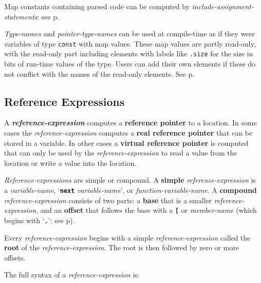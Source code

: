 \documentclass[12pt]{article}
\newcommand{\TT}[1]{{\tt \bfseries #1}}
\newcommand{\key}[1]{{\rm \bfseries #1}}
\newcommand{\emkey}[1]{{\em \bfseries #1}}
\newcommand{\pagref}[1]{p\pageref{#1}}
\begin{document}
Map constants containing parsed code can be computed
by {\em include-assignment-statements}:
see \pagref{INCLUDE-ASSIGNMENT-STATEMENT}.

{\em Type-names} and {\em pointer-type-names} can be used at
compile-time as if they were variables of type {\tt const}
with map values.  These map values are partly read-only,
with the read-only part including elements with labels like
{\tt .size} for the size in bits of run-time values of the type.
Users can add their own elements if these do not conflict
with the names of the read-only elements.  See \pagref{TYPE-MAPS}.

\subsection{Reference Expressions}
\label{REFERENCE-EXPRESSIONS}

A \emkey{reference-expression} computes a \key{reference pointer} to a location.
In some cases the {\em reference-expression}
computes a \key{real reference pointer} that can be stored in a variable.
In other cases a \key{virtual reference pointer} is computed that
can only be used by the {\em reference-expression} to read a value from the
location or write a value into the location.

{\em Reference-expressions} are simple or compound.
A \key{simple} {\em reference-expression} is
a {\em variable-name}, `\TT{next} {\em variable-name}', or
{\em function-variable-name}.
A \key{compound} {\em reference-expression} consists of two parts:
a \key{base} that is a smaller {\em reference-expression},
and an \key{offset} that follows the base with
a \TT{[} or {\em member-name}
(which begins with `\TT{.}': see \pagref{MEMBER-NAME}).

Every {\em reference-expression} begins with a simple
{\em reference-expression} called the \key{root} of the
{\em reference-expression}.  The root is then followed by zero or more
offsets.

The full syntax of a {\em reference-expression} is:
\end{document}
